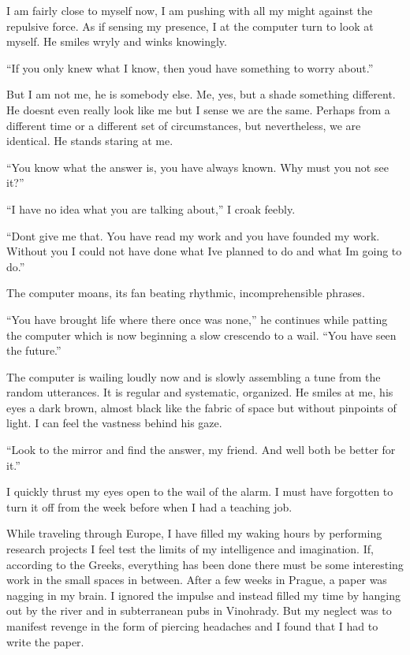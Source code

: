 I am fairly close to myself now, I am pushing with all my might against
the repulsive force. As if sensing my presence, I at the computer turn
to look at myself. He smiles wryly and winks knowingly.

``If you only knew what I know, then you\textquotesingle d have
something to worry about.''

But I am not me, he is somebody else. Me, yes, but a shade something
different. He doesn\textquotesingle t even really look like me but I
sense we are the same. Perhaps from a different time or a different set
of circumstances, but nevertheless, we are identical. He stands staring
at me.

``You know what the answer is, you have always known. Why must you not
see it?''

``I have no idea what you are talking about,'' I croak feebly.

``Don\textquotesingle t give me that. You have read my work and you have
founded my work. Without you I could not have done what
I\textquotesingle ve planned to do and what I\textquotesingle m going to
do.''

The computer moans, its fan beating rhythmic, incomprehensible phrases.

``You have brought life where there once was none,'' he continues while
patting the computer which is now beginning a slow crescendo to a wail.
``You have seen the future.''

The computer is wailing loudly now and is slowly assembling a tune from
the random utterances. It is regular and systematic, organized. He
smiles at me, his eyes a dark brown, almost black like the fabric of
space but without pinpoints of light. I can feel the vastness behind his
gaze.

``Look to the mirror and find the answer, my friend. And
we\textquotesingle ll both be better for it.''

I quickly thrust my eyes open to the wail of the alarm. I must have
forgotten to turn it off from the week before when I had a teaching job.

While traveling through Europe, I have filled my waking hours by
performing research projects I feel test the limits of my intelligence
and imagination. If, according to the Greeks, everything has been done
there must be some interesting work in the small spaces in between.
After a few weeks in Prague, a paper was nagging in my brain. I ignored
the impulse and instead filled my time by hanging out by the river and
in subterranean pubs in Vinohrady. But my neglect was to manifest
revenge in the form of piercing headaches and I found that I had to
write the paper.

